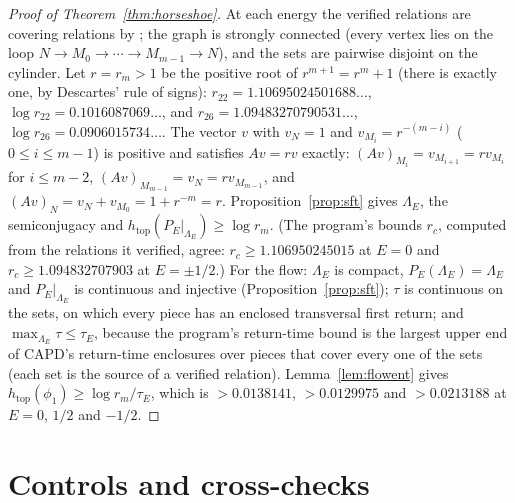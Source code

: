 \documentclass[11pt]{article}
\theoremstyle{definition}
\newcommand{\htop}{h_{\mathrm{top}}}
\begin{document}
\begin{proof}[Proof of Theorem~\ref{thm:horseshoe}]
At each energy the verified relations are covering relations by \cite[Thm.~16]{zg2004}; the graph is strongly connected (every vertex lies on the loop $N \to M_0 \to \cdots \to M_{m-1} \to N$), and the sets are pairwise disjoint on the cylinder. Let $r = r_m > 1$ be the positive root of $r^{m+1} = r^m + 1$ (there is exactly one, by Descartes' rule of signs): $r_{22} = 1.10695024501688\ldots$, $\log r_{22} = 0.1016087069\ldots$, and $r_{26} = 1.09483270790531\ldots$, $\log r_{26} = 0.0906015734\ldots$. The vector $v$ with $v_N = 1$ and $v_{M_i} = r^{-(m - i)}$ ($0 \le i \le m - 1$) is positive and satisfies $Av = rv$ exactly: $(Av)_{M_i} = v_{M_{i+1}} = rv_{M_i}$ for $i \le m - 2$, $(Av)_{M_{m-1}} = v_N = rv_{M_{m-1}}$, and $(Av)_N = v_N + v_{M_0} = 1 + r^{-m} = r$. Proposition~\ref{prop:sft} gives $\Lambda_E$, the semiconjugacy and $\htop(P_E|_{\Lambda_E}) \ge \log r_m$. (The program's bounds $r_c$, computed from the relations it verified, agree: $r_c \ge 1.106950245015$ at $E = 0$ and $r_c \ge 1.094832707903$ at $E = \pm1/2$.) For the flow: $\Lambda_E$ is compact, $P_E(\Lambda_E) = \Lambda_E$ and $P_E|_{\Lambda_E}$ is continuous and injective (Proposition~\ref{prop:sft}); $\tau$ is continuous on the sets, on which every piece has an enclosed transversal first return; and $\max_{\Lambda_E}\tau \le \tau_E$, because the program's return-time bound is the largest upper end of CAPD's return-time enclosures over pieces that cover every one of the sets (each set is the source of a verified relation). Lemma~\ref{lem:flowent} gives $\htop(\phi_1) \ge \log r_m/\tau_E$, which is $> 0.0138141$, $> 0.0129975$ and $> 0.0213188$ at $E = 0$, $1/2$ and $-1/2$.
\end{proof}

\section{Controls and cross-checks}\label{sec:controls}
\end{document}
